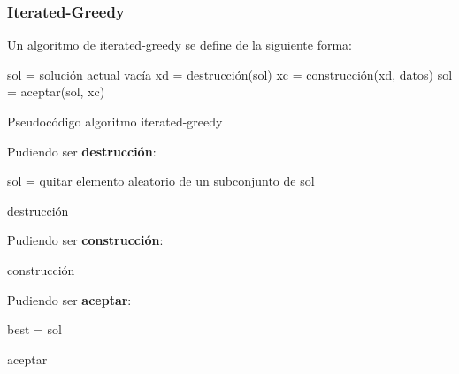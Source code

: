 \documentclass[13pt,a4paper]{article}
\begin{document}

\newpage

\subsubsection{Iterated-Greedy}

Un algoritmo de iterated-greedy se define de la siguiente forma:

\begin{algorithm}[H]
    \SetAlgoLined
        sol = solución actual vacía \;
         {
            xd = destrucción(sol) \;
            xc = construcción(xd, datos) \;
            sol = aceptar(sol, xc) \;
        }        
    \caption{Pseudocódigo algoritmo iterated-greedy}
\end{algorithm}

\vspace{\baselineskip}

Pudiendo ser \textbf{destrucción}:

\begin{algorithm}[H]
    \SetAlgoLined
        sol = quitar elemento aleatorio de un subconjunto de sol \;
    \caption{destrucción}
\end{algorithm}

\vspace{\baselineskip}

Pudiendo ser \textbf{construcción}:

\begin{algorithm}[H]
    \SetAlgoLined
    \caption{construcción}
\end{algorithm}

\vspace{\baselineskip}

Pudiendo ser \textbf{aceptar}:

\begin{algorithm}[H]
    \SetAlgoLined
        best = sol \;
    \caption{aceptar}
\end{algorithm}

\end{document}

